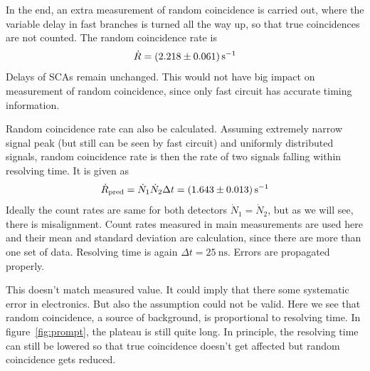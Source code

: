 In the end, an extra measurement of random coincidence is carried out, where the variable delay in fast branches is turned all the way up, so that true coincidences are not counted. The random coincidence rate is
\begin{equation}
   \dot{R} = \SI{2.218 +- 0.061}{\per\s}
   \label{math:random}
\end{equation}
Delays of SCAs remain unchanged. This would not have big impact on measurement of random coincidence, since only fast circuit has accurate timing information.

Random coincidence rate can also be calculated. Assuming extremely narrow signal peak (but still can be seen by fast circuit) and uniformly distributed signals, random coincidence rate is then the rate of two signals falling within resolving time.  It is given as~\cite{melissinos}
\begin{equation}
   \dot{R}_\text{pred} = \dot{N}_1 \dot{N}_2 \Delta t = \SI{1.643 +- 0.013}{\per\s}
\end{equation}
Ideally the count rates are same for both detectors $\dot{N}_1 = \dot{N}_2$, but as we will see, there is misalignment. Count rates measured in main measurements are used here and their mean and standard deviation are calculation, since there are more than one set of data. Resolving time is again $\Delta t = \SI{25}{\nano\s}$. Errors are propagated properly.

This doesn't match measured value. It could imply that there some systematic error in electronics. But also the assumption could not be valid. Here we see that random coincidence, a source of background, is proportional to resolving time. In figure~\ref{fig:prompt}, the plateau is still quite long. In principle, the resolving time can still be lowered so that true coincidence doesn't get affected but random coincidence gets reduced.
\clearpage
